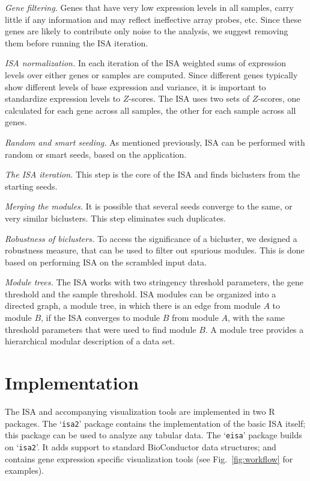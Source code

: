 \documentclass{bioinfo}
\newcommand{\Rpackage}[1]{`\texttt{#1}'}
\begin{document}
\emph{Gene filtering.}
Genes that have very low expression levels in all samples, carry little if
any information and may reflect ineffective array probes, etc. Since these
genes are likely to contribute only noise to the analysis, we suggest
removing them before running the ISA iteration.

\emph{ISA normalization.}
In each iteration of the ISA weighted sums of expression levels over either
genes or samples are computed. Since different genes
typically show different levels of base
expression and variance, it is important to standardize expression
levels to $Z$-scores. The ISA uses two sets of $Z$-scores, one
calculated for each gene across all samples, the other for each sample
across all genes.

\emph{Random and smart seeding.}
As mentioned previously, ISA can be performed with random or smart
seeds, based on the application.

\emph{The ISA iteration.}
This step is the core of the ISA and finds biclusters from the
starting seeds.

\emph{Merging the modules.}
It is possible that several seeds converge to the same, or very similar
biclusters. This step eliminates such duplicates.

\emph{Robustness of biclusters.}
To access the significance of a bicluster, we designed a robustness
measure, that can be used to filter out spurious modules. This is done
based on performing ISA on the scrambled input data.

\emph{Module trees.}
The ISA works with two stringency threshold parameters, the gene
threshold and the sample threshold. ISA modules can be organized into
a directed graph, a module tree, in which there is an edge from module
$A$ to module $B$, if the ISA converges to module $B$ from module $A$,
with the same threshold parameters  that were used to find module
$B$. A module tree provides a hierarchical modular description of a
data set.

\section{Implementation}%
\label{sec:implementation}

The ISA and accompanying visualization tools are implemented in two R
packages. The \Rpackage{isa2} package contains the implementation of
the basic ISA itself; this package can be used to analyze any tabular
data. The \Rpackage{eisa} package builds on \Rpackage{isa2}. It adds
support to standard BioConductor data structures; and
contains gene expression specific visualization tools (see 
Fig.~\ref{fig:workflow} for examples).
\end{document}
